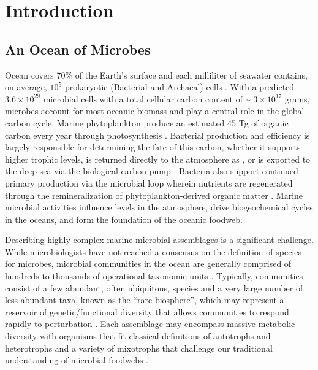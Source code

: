 \chapter{Introduction}\label{ch:intro}

\section{An Ocean of Microbes}
 
Ocean covers 70\% of the Earth's surface and each milliliter of seawater contains, on average, $10^{5}$ prokaryotic (Bacterial and Archaeal) cells \citep{Whitman1998-sj,Porter1980-er,Hobbie1977-fh}. With a predicted $3.6 \times 10^{29}$ microbial cells with a total cellular carbon content of \textasciitilde{} $3 \times 10^{17}$ grams, microbes account for most oceanic biomass and play a central role in the global carbon cycle. Marine phytoplankton produce an estimated 45 Tg of organic carbon every year through photosynthesis \citep{Falkowski1998-pw}. Bacterial production and efficiency is largely responsible for determining the fate of this carbon, whether it supports higher trophic levels, is returned directly to the atmosphere as , or is exported to the deep sea via the biological carbon pump \citep{Jiao2010-vq}. Bacteria also support continued primary production via the microbial loop wherein nutrients are regenerated through the remineralization of phytoplankton-derived organic matter \citep{Azam1983-wo}. Marine microbial activities influence  levels in the atmosphere, drive biogeochemical cycles in the oceans, and form the foundation of the oceanic foodweb.
 
Describing highly complex marine microbial assemblages is a significant challenge. While microbiologists have not reached a consensus on the definition of species for microbes, microbial communities in the ocean are generally comprised of hundreds to thousands of operational taxonomic units \citep{smhwhnah06,Sunagawa1261359}. Typically, communities consist of a few abundant, often ubiquitous, species and a very large number of less abundant taxa, known as the ``rare biosphere'', which may represent a reservoir of genetic/functional diversity that allows communities to respond rapidly to perturbation \citep{Gibbons2013-fy,smhwhnah06,pedrosalio2006}. Each assemblage may encompass massive metabolic diversity with organisms that fit classical definitions of autotrophs and heterotrophs and a variety of mixotrophs that challenge our traditional understanding of microbial foodwebs \citep{Moran2015-dd}.

